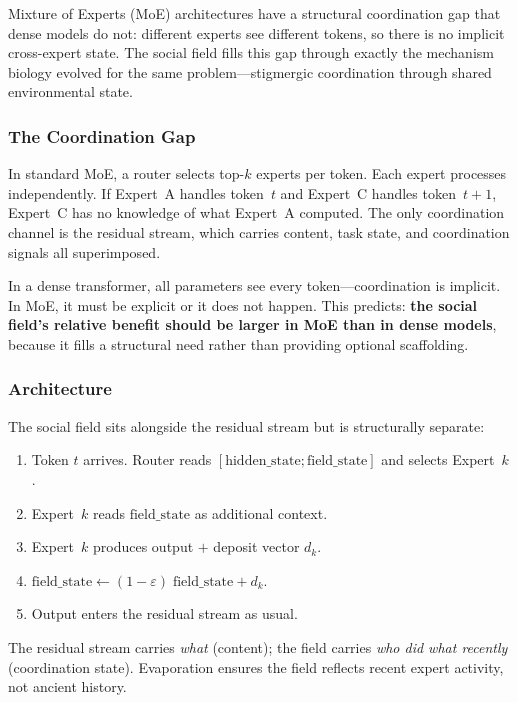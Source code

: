 \documentclass[11pt,a4paper]{article}
\begin{document}
Mixture of Experts (MoE) architectures have a structural coordination
gap that dense models do not: different experts see different tokens,
so there is no implicit cross-expert state.  The social field fills
this gap through exactly the mechanism biology evolved for the same
problem---stigmergic coordination through shared environmental state.

\subsubsection{The Coordination Gap}

In standard MoE, a router selects top-$k$ experts per token.  Each
expert processes independently.  If Expert~A handles token~$t$ and
Expert~C handles token~$t\!+\!1$, Expert~C has no knowledge of what
Expert~A computed.  The only coordination channel is the residual
stream, which carries content, task state, and coordination signals
all superimposed.

In a dense transformer, all parameters see every token---coordination
is implicit.  In MoE, it must be explicit or it does not happen.  This
predicts: \textbf{the social field's relative benefit should be larger
in MoE than in dense models}, because it fills a structural need
rather than providing optional scaffolding.

\subsubsection{Architecture}

The social field sits alongside the residual stream but is structurally
separate:
\begin{enumerate}
    \item Token $t$ arrives.  Router reads
          $[\text{hidden\_state}; \text{field\_state}]$ and selects
          Expert~$k$.
    \item Expert~$k$ reads $\text{field\_state}$ as additional context.
    \item Expert~$k$ produces output $+$ deposit vector $d_k$.
    \item $\text{field\_state} \leftarrow
          (1-\varepsilon)\;\text{field\_state} + d_k$.
    \item Output enters the residual stream as usual.
\end{enumerate}
The residual stream carries \emph{what} (content); the field carries
\emph{who did what recently} (coordination state).  Evaporation ensures
the field reflects recent expert activity, not ancient history.
\end{document}
